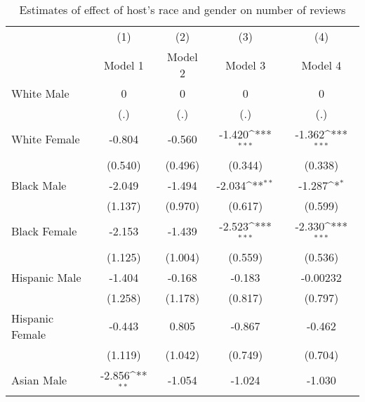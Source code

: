 {
\def\sym#1{\ifmmode^{#1}\else\(^{#1}\)\fi}
\begin{longtable}{l*{4}{c}}
\caption{Estimates of effect of host's race and gender on number of reviews}\\
\hline\hline\endfirsthead\hline\endhead\hline\endfoot\endlastfoot
                    &\multicolumn{1}{c}{(1)}&\multicolumn{1}{c}{(2)}&\multicolumn{1}{c}{(3)}&\multicolumn{1}{c}{(4)}\\
                    &\multicolumn{1}{c}{Model 1}&\multicolumn{1}{c}{Model 2}&\multicolumn{1}{c}{Model 3}&\multicolumn{1}{c}{Model 4}\\
\hline
White Male          &           0         &           0         &           0         &           0         \\
                    &         (.)         &         (.)         &         (.)         &         (.)         \\
[1em]
White Female        &      -0.804         &      -0.560         &      -1.420\sym{***}&      -1.362\sym{***}\\
                    &     (0.540)         &     (0.496)         &     (0.344)         &     (0.338)         \\
[1em]
Black Male          &      -2.049         &      -1.494         &      -2.034\sym{**} &      -1.287\sym{*}  \\
                    &     (1.137)         &     (0.970)         &     (0.617)         &     (0.599)         \\
[1em]
Black Female        &      -2.153         &      -1.439         &      -2.523\sym{***}&      -2.330\sym{***}\\
                    &     (1.125)         &     (1.004)         &     (0.559)         &     (0.536)         \\
[1em]
Hispanic Male       &      -1.404         &      -0.168         &      -0.183         &    -0.00232         \\
                    &     (1.258)         &     (1.178)         &     (0.817)         &     (0.797)         \\
[1em]
Hispanic Female     &      -0.443         &       0.805         &      -0.867         &      -0.462         \\
                    &     (1.119)         &     (1.042)         &     (0.749)         &     (0.704)         \\
[1em]
Asian Male          &      -2.856\sym{**} &      -1.054         &      -1.024         &      -1.030         \\

\end{longtable}}
